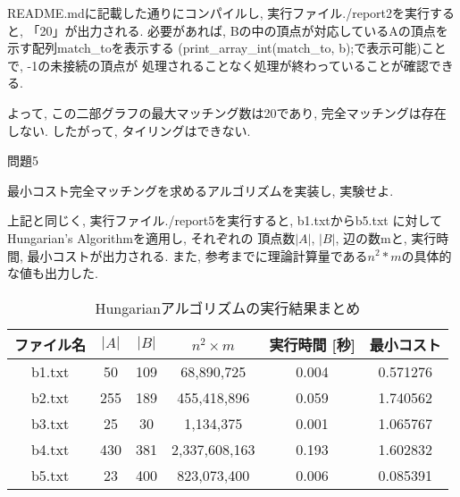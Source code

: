 \documentclass[a4paper]{ltjsarticle}
\begin{document}
README.mdに記載した通りにコンパイルし, 実行ファイル./report2を実行すると, 「20」が出力される.
必要があれば, Bの中の頂点が対応しているAの頂点を示す配列match\_toを表示する
(print\_array\_int(match\_to, b);で表示可能)ことで, -1の未接続の頂点が
処理されることなく処理が終わっていることが確認できる.

よって, この二部グラフの最大マッチング数は20であり, 完全マッチングは存在しない.
したがって, タイリングはできない.

問題5

最小コスト完全マッチングを求めるアルゴリズムを実装し, 実験せよ.

上記と同じく, 実行ファイル./report5を実行すると, b1.txtからb5.txt
に対してHungarian's Algorithmを適用し, それぞれの
頂点数$|A|$, $|B|$, 辺の数mと, 実行時間, 最小コストが出力される.
また, 参考までに理論計算量である$n^2 * m$の具体的な値も出力した.

\begin{table}[htbp]
\centering
\caption{Hungarianアルゴリズムの実行結果まとめ}
\begin{tabular}{|c|c|c|c|c|c|}
\hline
ファイル名 & $|A|$ & $|B|$ & $n^2 \times m$ & 実行時間 [秒] & 最小コスト \\
\hline
b1.txt & 50  & 109  & 68,890,725   & 0.004 & 0.571276 \\
b2.txt & 255 & 189  & 455,418,896  & 0.059 & 1.740562 \\
b3.txt & 25  & 30   & 1,134,375    & 0.001 & 1.065767 \\
b4.txt & 430 & 381  & 2,337,608,163 & 0.193 & 1.602832 \\
b5.txt & 23  & 400  & 823,073,400  & 0.006 & 0.085391 \\
\hline
\end{tabular}
\end{table}

\newpage
\end{document}
